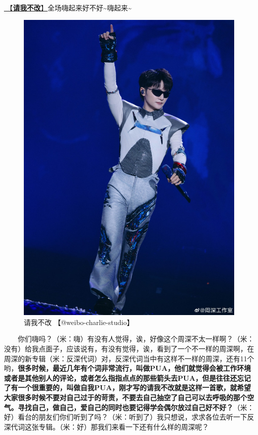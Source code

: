 \documentclass[]{ctexbook}
\begin{document}
\hyperref[brave-heart]{🎵【\textbf{请我不改}】}全场嗨起来好不好\textasciitilde 嗨起来\textasciitilde{}

\begin{figure}

{\centering \includegraphics[width=400pt]{img/chongqing20241007/001} 

}

\caption{请我不改 【@weibo-charlie-studio】}\label{fig:unnamed-chunk-120}
\end{figure}

  你们嗨吗？（米：嗨）有没有人觉得，诶，好像这个周深不太一样啊？（米：没有）给我点面子，应该说有，有没有觉得，诶，看到了一个不一样的周深啊，在周深的新专辑（米：反深代词）对，反深代词当中有这样不一样的周深，还有11个哟，\textbf{很多时候，最近几年有个词非常流行，叫做PUA，他们就觉得会被工作环境或者是其他别人的评论，或者怎么指指点点的那些箭头去PUA，但是往往还忘记了有一个很重要的，叫做自我PUA，刚才写的请我不改就是这样一首歌，就希望大家很多时候不要对自己过于的苛责，不要去自己抽空了自己可以去呼吸的那个空气。寻找自己，做自己，爱自己的同时也要记得学会偶尔放过自己好不好？}（米：好）看台的朋友们你们听到了吗？（米：听到了）我只想说，求求各位去听一下反深代词这张专辑。（米：好）那我们来看一下还有什么样的周深呢？
\end{document}
